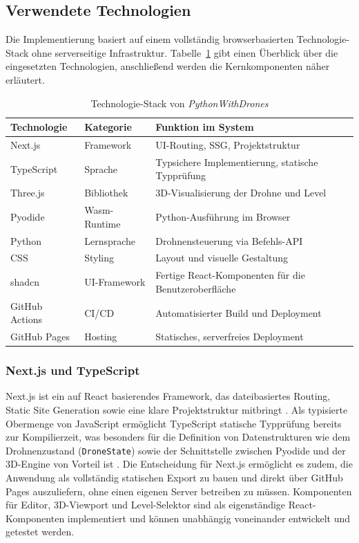\documentclass[a4paper,12pt]{article}
\begin{document}
	\subsection{Verwendete Technologien}
	
	Die Implementierung basiert auf einem vollständig browserbasierten
	Technologie-Stack ohne serverseitige Infrastruktur. Tabelle~\ref{tab:techstack}
	gibt einen Überblick über die eingesetzten Technologien, anschließend
	werden die Kernkomponenten näher erläutert.
	
	\begin{table}[htbp]
		\centering
		\caption{Technologie-Stack von \textit{PythonWithDrones}}
		\label{tab:techstack}
		\renewcommand{\arraystretch}{1.3}
		\begin{tabular}{lp{4cm}p{6.5cm}}
			\toprule
			\textbf{Technologie} & \textbf{Kategorie} & \textbf{Funktion im System} \\
			\midrule
			Next.js          & Framework       & UI-Routing, SSG, Projektstruktur \\
   			TypeScript       & Sprache         & Typsichere Implementierung, statische Typprüfung \\
			Three.js         & Bibliothek      & 3D-Visualisierung der Drohne und Level \\
			Pyodide          & Wasm-Runtime    & Python-Ausführung im Browser \\
			Python           & Lernsprache     & Drohnensteuerung via Befehls-API \\
			CSS              & Styling         & Layout und visuelle Gestaltung \\
			shadcn		 	 & UI-Framework    & Fertige React-Komponenten für die Benutzeroberfläche \\
			GitHub Actions   & CI/CD           & Automatisierter Build und Deployment \\
			GitHub Pages     & Hosting         & Statisches, serverfreies Deployment \\
			\bottomrule
		\end{tabular}
	\end{table}
	
	\subsubsection{Next.js und TypeScript}
	Next.js ist ein auf React basierendes Framework, das
	dateibasiertes Routing, Static Site Generation sowie eine klare
	Projektstruktur mitbringt \cite{nextjs}. Als typisierte Obermenge von JavaScript 
	ermöglicht TypeScript statische Typprüfung bereits zur Kompilierzeit, 
	was besonders für die Definition
	von Datenstrukturen wie dem Drohnenzustand (\texttt{DroneState}) sowie
	der Schnittstelle zwischen Pyodide und der 3D-Engine von Vorteil ist \cite{typescript}.
	Die Entscheidung für Next.js ermöglicht es zudem, die Anwendung als
	vollständig statischen Export zu bauen und direkt über GitHub Pages
	auszuliefern, ohne einen eigenen Server betreiben zu müssen. Komponenten
	für Editor, 3D-Viewport und Level-Selektor sind als eigenständige
	React-Komponenten implementiert und können unabhängig voneinander
	entwickelt und getestet werden.
	
\end{document}

